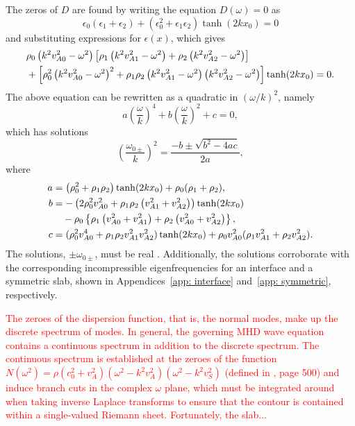 \documentclass[12pt, draft]{../style-files/ociamthesis}
\begin{document}
The zeros of $D$ are found by writing the equation $D(\omega) = 0$ as
\begin{equation}
\epsilon_0(\epsilon_1 + \epsilon_2) + \left(\epsilon_0^2 + \epsilon_1\epsilon_2\right)\tanh(2kx_0) = 0
\end{equation}
and substituting expressions for $\epsilon(x)$, which gives
\begin{align}
&\rho_0\left(k^2v_{A0}^2 - \omega^2\right)\left[\rho_1\left(k^2v_{A1}^2 - \omega^2\right) + \rho_2\left(k^2v_{A2}^2 - \omega^2\right)\right] \notag \\
&+ \left[\rho_0^2\left(k^2v_{A0}^2 - \omega^2\right)^2 + \rho_1\rho_2\left(k^2v_{A1}^2 - \omega^2\right)\left(k^2v_{A2}^2 - \omega^2\right)\right]\tanh(2kx_0) = 0.
\end{align}
The above equation can be rewritten as a quadratic in $(\omega/k)^2$, namely
\begin{equation}
a \left(\frac{\omega}{k}\right)^4 + b \left(\frac{\omega}{k}\right)^2 + c = 0,
\end{equation}
which has solutions
\begin{equation}
\left(\frac{\omega_{0\pm}}{k}\right)^2 = \frac{-b \pm \sqrt{b^2 - 4ac}}{2a},
\end{equation}
where
\begin{align}
a &= \left(\rho_0^2 + \rho_1\rho_2\right)\tanh(2kx_0) + \rho_0(\rho_1 + \rho_2), \label{solution a} \\
b &= -\left(2\rho_0^2v_{A0}^2 + \rho_1\rho_2\left(v_{A1}^2 + v_{A2}^2\right)\right)\tanh(2kx_0) \notag \\
& \quad - \rho_0 \left\{ \rho_1\left(v_{A0}^2 + v_{A1}^2\right) + \rho_2\left(v_{A0}^2 + v_{A2}^2\right) \right\}, \label{solution b} \\
c &= (\rho_0^2v_{A0}^4 + \rho_1\rho_2v_{A1}^2v_{A2}^2)\tanh(2kx_0) + \rho_0v_{A0}^2(\rho_1v_{A1}^2 + \rho_2v_{A2}^2). \label{solution c}
\end{align}
The solutions, $\pm\omega_{0\pm}$, must be real \citep{goe_etal04}. Additionally, the solutions corroborate with the corresponding incompressible eigenfrequencies for an interface and a symmetric slab, shown in Appendices~\ref{app: interface} and~\ref{app: symmetric}, respectively.

\textcolor{red}{
The zeroes of the dispersion function, that is, the normal modes, make up the discrete spectrum of modes. In general, the governing MHD wave equation contains a continuous spectrum in addition to the discrete spectrum. The continuous spectrum is established at the zeroes of the function $N(\omega^2) = \rho (c_0^2 + v_A^2)(\omega^2 - k^2v_A^2)(\omega^2 - k^2v_S^2)$ (defined in \cite{goe_etal04}, page 500) and induce branch cuts in the complex $\omega$ plane, which must be integrated around when taking inverse Laplace transforms to ensure that the contour is contained within a single-valued Riemann sheet. Fortunately, the slab...}
\end{document}
